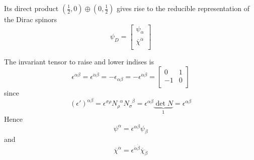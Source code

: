    Its direct product $(\frac{1}{2}, 0) \oplus (0, \frac{1}{2})$ gives rise to the reducible representation of the Dirac spinors
    \begin{equation*}
        \psi_D = \begin{bmatrix}
            \psi_\alpha \\
            \overline \chi^{\dot \alpha} \\
        \end{bmatrix}
    \end{equation*}

    The invariant tensor to raise and lower indises is 
    \begin{equation*}
        \epsilon^{\alpha \beta} = \epsilon^{\dot \alpha \dot \beta} = - \epsilon_{\alpha \beta} = - \epsilon^{\dot \alpha \dot \beta} = \begin{bmatrix}
            0 & 1 \\
            -1 & 0 \\
        \end{bmatrix}
    \end{equation*}
    since 
    \begin{equation*}
        (\epsilon')^{\alpha \beta} = \epsilon^{\sigma \rho} N_\rho^{\phantom \rho \alpha} N_\sigma^{\phantom \sigma \beta} = \epsilon^{\alpha \beta} \underbrace{\det N}_{1} = \epsilon^{\alpha \beta}
    \end{equation*}
    Hence 
    \begin{equation*}
        \psi^\alpha = \epsilon^{\alpha \beta} \psi_\beta 
    \end{equation*}
    and 
    \begin{equation}
        \overline \chi^{\dot \alpha} = \epsilon^{\dot \alpha \dot \beta} \overline \chi_{\dot \beta}
    \end{equation}

